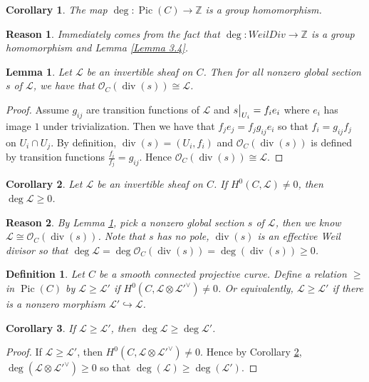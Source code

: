 \documentclass{ctexart}
\newtheorem{definition}{Definition}[section]
\newtheorem{lemma}{Lemma}[section]
\newtheorem{reason}{Reason}[section]
\newtheorem{corollary}{Corollary}[section]
\newcommand{\picardscheme}{\operatorname{Pic}}
\newcommand{\divisor}{\operatorname{div}}
\begin{document}
\begin{corollary}
    The map $\deg: \picardscheme (C) \rightarrow \mathbb{Z}$ is a group homomorphism.
    \label{Corollary 3.2}
\end{corollary}
\begin{reason}
    Immediately comes from the fact that $\deg: WeilDiv \rightarrow \mathbb{Z}$ is a group homomorphism and Lemma \ref{Lemma 3.4}.
\end{reason}
\begin{lemma}
    Let $\mathcal{L}$ be an invertible sheaf on $C$.
    Then for all nonzero global section $s$ of $\mathcal{L}$, we have that $\mathcal{O}_{C}(\divisor (s)) \cong \mathcal{L}$.
    \label{Lemma 3.5}
\end{lemma}
\begin{proof}
    Assume $g_{ij}$ are transition functions of $\mathcal{L}$ and $s\big{|}_{U_{i}} = f_{i}e_{i}$ where $e_{i}$ has image $1$ under trivialization.
    Then we have that $f_{j}e_{j} = f_{j}g_{ij}e_{i}$ so that $f_{i} = g_{ij}f_{j}$ on $U_{i} \cap U_{j}$.
    By definition, $\divisor (s) = (U_{i}, f_{i})$ and $\mathcal{O}_{C}(\divisor (s))$ is defined by transition functions $\frac{f_{i}}{f_{j}} = g_{ij}$.
    Hence $\mathcal{O}_{C}(\divisor (s)) \cong \mathcal{L}$.
\end{proof}
\begin{corollary}
    Let $\mathcal{L}$ be an invertible sheaf on $C$.
    If $H^{0}(C, \mathcal{L}) \neq 0$, then $\deg \mathcal{L} \ge 0$.
    \label{Corollary 3.3}
\end{corollary}
\begin{reason}
    By Lemma \ref{Lemma 3.5}, pick a nonzero global section $s$ of $\mathcal{L}$,
    then we know $\mathcal{L} \cong \mathcal{O}_{C}(\divisor (s))$.
    Note that $s$ has no pole, $\divisor (s)$ is an effective Weil divisor so that $\deg \mathcal{L} = \deg \mathcal{O}_{C}(\divisor (s)) = \deg (\divisor (s)) \ge 0$.
\end{reason}
\begin{definition}
    Let $C$ be a smooth connected projective curve.
    Define a relation $\ge$ in $\picardscheme (C)$ by $\mathcal{L} \ge \mathcal{L}'$ if $H^{0}(C, \mathcal{L} \otimes \mathcal{L}'^{\vee}) \neq 0$.
    Or equivalently, $\mathcal{L} \ge \mathcal{L}'$ if there is a nonzero morphism $\mathcal{L}' \hookrightarrow \mathcal{L}$.
\end{definition}
\begin{corollary}
    If $\mathcal{L} \ge \mathcal{L}'$, then $\deg \mathcal{L} \ge \deg \mathcal{L}'$.
    \label{Corollary 3.4}
\end{corollary}
\begin{proof}
    If $\mathcal{L} \ge \mathcal{L}'$, then $H^{0}(C, \mathcal{L} \otimes \mathcal{L}'^{\vee}) \neq 0$.
    Hence by Corollary \ref{Corollary 3.3}, $\deg (\mathcal{L} \otimes \mathcal{L}'^{\vee}) \ge 0$ so that $\deg (\mathcal{L}) \ge \deg (\mathcal{L}')$.
\end{proof}
\end{document}
